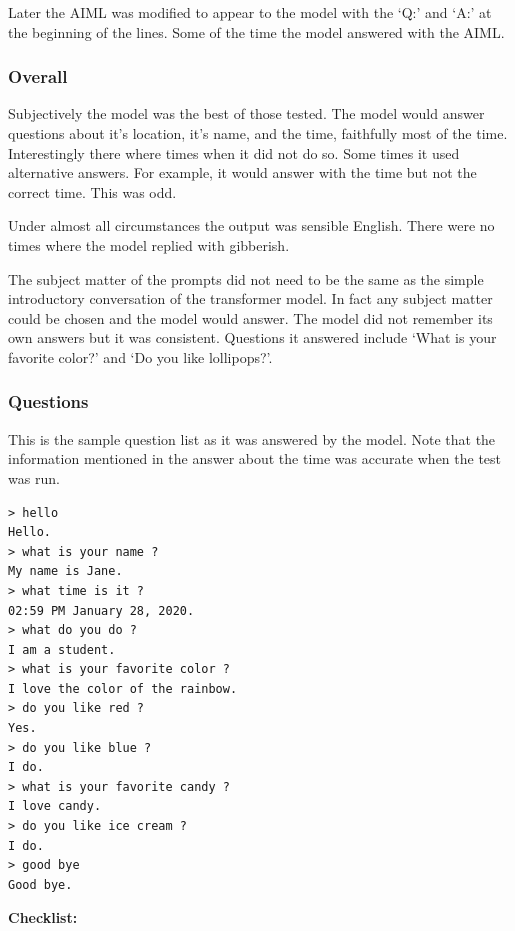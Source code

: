 Later the AIML was modified to appear to the model with the `Q:' and `A:' at the beginning of the lines. Some of the time the model answered with the AIML. 

\subsubsection{Overall}

Subjectively the model was the best of those tested. The model would answer questions about it's location, it's name, and the time, faithfully most of the time. Interestingly there where times when it did not do so. Some times it used alternative answers. For example, it would answer with the time but not the correct time. This was odd.

Under almost all circumstances the output was sensible English. There were no times where the model replied with gibberish. 

The subject matter of the prompts did not need to be the same as the simple introductory conversation of the transformer model. In fact any subject matter could be chosen and the model would answer. The model did not remember its own answers but it was consistent. Questions it answered include `What is your favorite color?' and `Do you like lollipops?'. 

\subsubsection*{Questions}
This is the sample question list as it was answered by the model. Note that the information mentioned in the answer about the time was accurate when the test was run.

\begin{verbatim}
> hello
Hello.
> what is your name ?
My name is Jane.
> what time is it ?
02:59 PM January 28, 2020.
> what do you do ?
I am a student.
> what is your favorite color ?
I love the color of the rainbow.
> do you like red ?
Yes.
> do you like blue ?
I do.
> what is your favorite candy ?
I love candy.
> do you like ice cream ?
I do. 
> good bye
Good bye.
\end{verbatim}

\noindent \textbf{Checklist:} 


